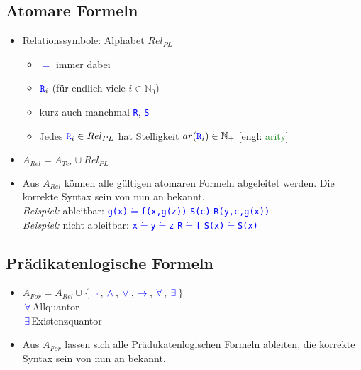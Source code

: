 \documentclass{article}
\newcommand{\N}{\mathbb{N_+}} %
\newcommand{\Nz}{{\mathbb{N}_0}} %
\newcommand{\deq}{$\dot{=}$}
\newcommand{\blue}[1]{\textcolor{blue}{#1}}
\newcommand{\important}[1]{\textcolor{importantColor}{#1}}
\newcommand{\verweis}[1]{\textcolor{ForestGreen}{#1}}
\newcommand{\example}[1]{\textit{Beispiel: }#1}
\newcommand{\word}[1]{\blue{\texttt{#1}}}
\newcommand{\set}[1]{\{#1\}}
\newcommand{\wnot}{$\,$\word{$\lnot$}$\,$}
\newcommand{\wand}{$\,$\word{$\land$}$\,$}
\newcommand{\wor}{$\,$\word{$\lor$}$\,$}
\newcommand{\wimpl}{$\,$\word{$\rightarrow$}$\,$}
\newcommand{\wall}{$\,$\word{$\forall$}$\,$}
\newcommand{\wexist}{$\,$\word{$\exists$}$\,$}
\begin{document}
\subsection{Atomare Formeln}
\begin{itemize}
    \item \important{Relationssymbole}: Alphabet $Rel_{PL}$
    \begin{itemize}
        \item \word{\deq} immer dabei
        \item $\word{R}_i$ (für endlich viele $i\in \Nz$)
        \item kurz auch manchmal \word{R}, \word{S}
        \item Jedes $\word{R}_i \in Rel_{PL}$ hat \important{Stelligkeit} $ar(\word{R}_i) \in \N$ [engl: \verweis{arity}]
    \end{itemize}
    \item $A_{Rel} = A_{Ter}\cup Rel_{PL}$
    \item Aus $A_{Rel}$ können alle gültigen atomaren Formeln abgeleitet werden. Die korrekte Syntax sein von nun an bekannt.\\
    \example \hphantom{nicht }ableitbar: \quad \word{g(x)\deq f(x,g(z))} \qquad \word{S(c)} \qquad \word{R(y,c,g(x))}\\
    \example nicht ableitbar: \quad \word{x\deq y\deq z} \qquad \word{R\deq f} \qquad \word{S(x)\deq S(x)}
\end{itemize}

\subsection{Prädikatenlogische Formeln}
\begin{itemize}
    \item $A_{For} = A_{Rel} \cup \set{\wnot, \wand, \wor, \wimpl, \wall, \wexist}$\\
    \wall \quad \important{Allquantor}\\
    \wexist \quad \important {Existenzquantor}
    \item Aus $A_{For}$ lassen sich alle Prädukatenlogischen Formeln ableiten, die korrekte Syntax sein von nun an bekannt.
\end{itemize}
\end{document}
